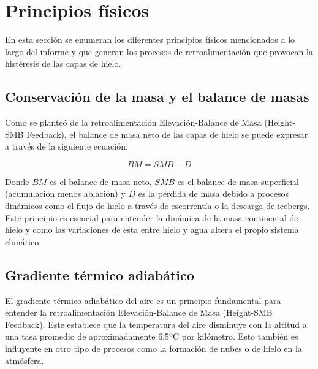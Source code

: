 \documentclass[12pt,a4paper,chapterprefix=false,headings=twolinechapter]{scrreprt}
\begin{document}
\setcounter{section}{0}

\printbibliography

\setcounter{section}{0}
\chapter*{Principios físicos}

En esta sección se enumeran los diferentes principios físicos mencionados a lo largo del informe y que generan los procesos de retroalimentación que provocan la histéresis de las capas de hielo.

\vspace{0.5cm}

\section{Conservación de la masa y el balance de masas}
Como se planteó de la retroalimentación Elevación-Balance de Masa (Height-SMB Feedback), el balance de masa neto de las capas de hielo se puede expresar a través de la siguiente ecuación:

\begin{equation}
    BM = SMB - D
\end{equation}

Donde $BM$ es el balance de masa neto, $SMB$ es el balance de masa superficial (acumulación menos ablación) y $D$ es la pérdida de masa debido a procesos dinámicos como el flujo de hielo a través de escorrentía o la descarga de icebergs. 
Este principio es esencial para entender la dinámica de la masa continental de hielo y como las variaciones de esta entre hielo y agua altera el propio sistema climático.

\vspace{0.5cm}

\section{Gradiente térmico adiabático}
El gradiente térmico adiabático del aire es un principio fundamental para entender la retroalimentación Elevación-Balance de Masa (Height-SMB Feedback). Este establece que la temperatura del aire disminuye con la altitud a una tasa promedio 
de aproximadamente 6.5ºC por kilómetro. Esto también es influyente en otro tipo de procesos como la formación de nubes o de hielo en la atmósfera. 
\end{document}
